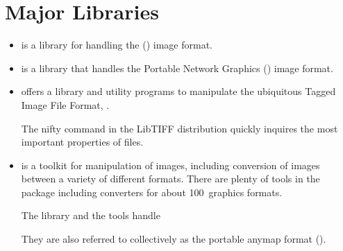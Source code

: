 \section[Libraries]{\label{sec:helpful-libraries}%
  Major Libraries}

\begin{itemize}
  \label{lib:jpeg}%
\item
   is a library for handling the  () image
  format.

  \label{lib:png}%
\item
   is a library that handles the Portable Network Graphics
  () image format.

  \label{lib:tiff}%
\item
   offers a library and utility programs to manipulate
  the ubiquitous Tagged Image File Format, .

  The nifty  command in the LibTIFF distribution quickly inquires the most
  important properties of  files.

  \label{lib:netpbm}%
\item
   is a toolkit for manipulation of images, including conversion of images
  between a variety of different formats.  There are plenty of tools in the package including
  converters for about 100~graphics formats.

  The library and the tools handle


  They are also referred to collectively as the portable anymap format ().
\end{itemize}


